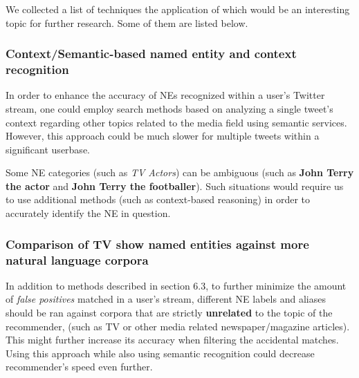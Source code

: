 We collected a list of techniques the application of which would be an
interesting topic for further research. Some of them are listed below.

\subsubsection{Context/Semantic-based named entity and context recognition}

In order to enhance the accuracy of NEs recognized within a user's Twitter
stream, one could employ search methods based on analyzing a single tweet's
context regarding other topics related to the media field using semantic
services.  However, this approach could be much slower for multiple tweets
within a significant userbase.

Some NE categories (such as \textit{TV Actors}) can be ambiguous
(such as \textbf{John Terry the actor} and \textbf{John Terry the footballer}).
Such situations would require us to use additional methods (such as context-based
reasoning) in order to accurately identify the NE in question.

\subsubsection{Comparison of TV show named entities against more natural language corpora}

In addition to methods described in section 6.3, to further minimize the amount of \textit{false positives}
matched in a user's stream, different NE labels and aliases should be ran against corpora
that are strictly \textbf{unrelated} to the topic of the recommender, (such as TV or other media related
newspaper/magazine articles). This might further increase its accuracy when filtering the accidental
matches. Using this approach while also using semantic recognition could decrease recommender's
speed even further.
